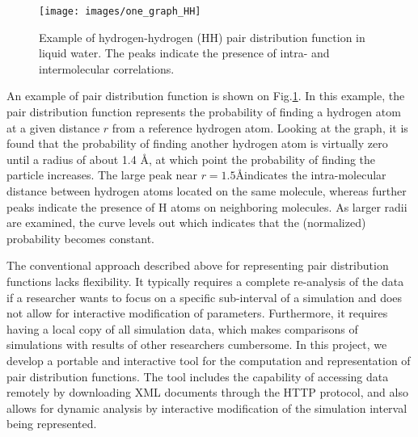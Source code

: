 \begin{figure}
\texttt{[image: images/one\_graph\_HH]}
\caption{\label{fig:sample} Example of hydrogen-hydrogen (HH) pair distribution function in liquid water. The peaks indicate the presence of intra- and intermolecular correlations.}
\end{figure}
An example of pair distribution function is shown on Fig.\ref{fig:sample}.
In this example, the pair distribution function represents the probability of finding a hydrogen atom at a given distance $r$ from a reference hydrogen atom. Looking at the graph, it is found that the probability of finding another hydrogen atom is virtually zero until a radius of about 1.4 \AA, at which point the probability of finding the particle increases. The large peak near $r=1.5$\AA  indicates the intra-molecular distance between hydrogen atoms located on the same molecule, whereas further peaks indicate the presence of H atoms on neighboring molecules. As larger radii are examined, the curve levels out which indicates that the (normalized) probability becomes constant. 

The conventional approach described above for representing pair distribution functions lacks flexibility. It typically requires a complete re-analysis of the data if a researcher wants to focus on a specific sub-interval of a simulation and does not allow for interactive modification of parameters. Furthermore, it requires having a local copy of all simulation data, which makes comparisons of simulations with results of other researchers cumbersome. In this project, we develop a portable and interactive tool for the computation and representation of pair distribution functions. The tool includes the capability of accessing data remotely by downloading XML documents through the HTTP protocol, and also allows for dynamic analysis by interactive modification of the simulation interval being represented. 

